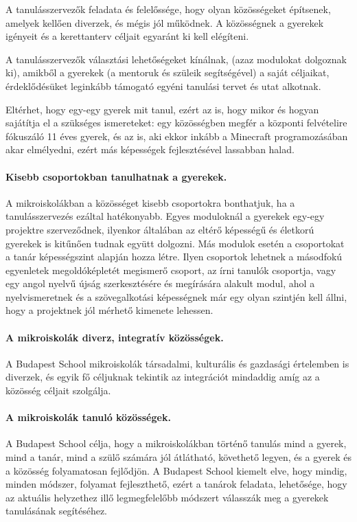A tanulásszervezők feladata és felelőssége, hogy olyan közösségeket építsenek, amelyek kellően diverzek, és mégis jól
működnek. A közösségnek a gyerekek igényeit és a kerettanterv céljait egyaránt
ki kell elégíteni.

A tanulásszervezők választási lehetőségeket kínálnak, (azaz modulokat dolgoznak
ki), amikből a gyerekek (a mentoruk és szüleik segítségével) a saját céljaikat,
érdeklődésüket leginkább támogató egyéni tanulási tervet és utat alkotnak.

Eltérhet, hogy egy-egy gyerek mit tanul, ezért az is, hogy mikor és hogyan
sajátítja el a szükséges ismereteket: egy közösségben megfér a központi
felvételire fókuszáló 11 éves gyerek, és az is, aki ekkor inkább a Minecraft
programozásában akar elmélyedni, ezért más képességek fejlesztésével lassabban
halad.

\paragraph{Kisebb csoportokban tanulhatnak a gyerekek.}
\label{sec:csoportbontasok}

A mikroiskolákban a közösséget kisebb csoportokra bonthatjuk, ha a
tanulásszervezés ezáltal hatékonyabb. Egyes moduloknál a gyerekek egy-egy
projektre szerveződnek, ilyenkor általában az eltérő képességű és életkorú
gyerekek is kitűnően tudnak együtt dolgozni. Más modulok esetén a csoportokat a
tanár képességszint alapján hozza létre. Ilyen csoportok lehetnek a másodfokú
egyenletek megoldóképletét megismerő csoport, az írni tanulók csoportja, vagy
egy angol nyelvű újság szerkesztésére és megírására alakult modul, ahol a
nyelvismeretnek és a szövegalkotási képességnek már egy olyan szintjén kell
állni, hogy a projektnek jól mérhető kimenete lehessen.

\paragraph{A mikroiskolák diverz, integratív közösségek.}
A Budapest School mikroiskolák társadalmi, kulturális és gazdasági értelemben
is diverzek, és egyik fő céljuknak tekintik az integrációt mindaddig amíg
az a közösség céljait szolgálja.

\paragraph{A mikroiskolák tanuló közösségek.}
A Budapest School célja, hogy a mikroiskolákban történő tanulás mind a gyerek,
mind a tanár, mind a szülő számára jól átlátható, követhető legyen, és a gyerek
és a közösség folyamatosan fejlődjön.
A Budapest School kiemelt elve, hogy mindig, minden módszer, folyamat
fejleszthető, ezért a tanárok feladata, lehetősége, hogy az aktuális helyzethez
illő legmegfelelőbb módszert válasszák meg a gyerekek tanulásának segítéséhez.

